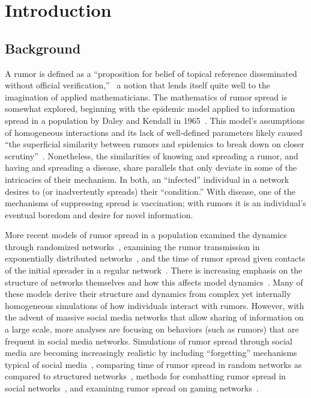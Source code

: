 \section{Introduction }
\label{sec:introduction}

\subsection{Background}
\label{subsec:background}

A rumor is defined as a ``proposition for belief of topical reference disseminated without official verification,''~\cite{knapp-1944} a notion that lends itself quite well to the imagination of applied mathematicians.
The mathematics of rumor spread is somewhat explored, beginning with the epidemic model applied to information spread in a population by Daley and Kendall in 1965~\cite{daley-1965}.
This model's assumptions of homogeneous interactions and its lack of well-defined parameters likely caused ``the superficial similarity between rumors and epidemics to break down on closer scrutiny''~\cite{daley-1965}.
Nonetheless, the similarities of knowing and spreading a rumor, and having and spreading a disease, share parallels that only deviate in some of the intricacies of their mechanism.
In both, an ``infected'' individual in a network desires to (or inadvertently spreads) their ``condition.''
With disease, one of the mechanisms of suppressing spread is vaccination; with rumors it is an individual's eventual boredom and desire for novel information.

More recent models of rumor spread in a population examined the dynamics through randomized networks~\cite{karp-2000}, examining the rumor transmission in exponentially distributed networks~\cite{moreno-2004}, and the time of rumor spread given contacts of the initial spreader in a regular network~\cite{fount-2010}.
There is increasing emphasis on the structure of networks themselves and how this affects model dynamics~\cite{zhang-2013, pellis-2015, pellis-2012, ball-2010, zhou-2007}.
Many of these models derive their structure and dynamics from complex yet internally homogeneous simulations of how individuals interact with rumors.
However, with the advent of massive social media networks that allow sharing of information on a large scale, more analyses are focusing on behaviors (such as rumors) that are frequent in social media networks.
Simulations of rumor spread through social media are becoming increasingly realistic by including ``forgetting'' mechanisms typical of social media~\cite{zhao-2011}, comparing time of rumor spread in random networks as compared to structured networks~\cite{liu-2011}, methods for combatting rumor spread in social networks~\cite{tripathy-2010}, and examining rumor spread on gaming networks~\cite{grab-2008}.

